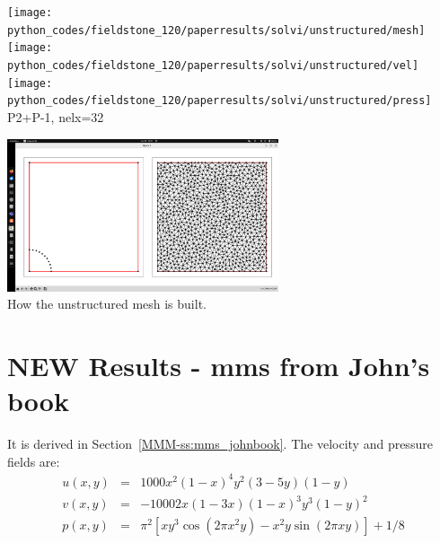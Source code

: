 \begin{center}
\texttt{[image: python\_codes/fieldstone\_120/paperresults/solvi/unstructured/mesh]}
\texttt{[image: python\_codes/fieldstone\_120/paperresults/solvi/unstructured/vel]}
\texttt{[image: python\_codes/fieldstone\_120/paperresults/solvi/unstructured/press]}\\
{\captionfont P2+P-1, nelx=32}
\end{center}


\begin{center}
\includegraphics[width=8cm]{python_codes/fieldstone_120/images/solvi_mesh}\\
{\captionfont How the unstructured mesh is built.}
\end{center}








\newpage
\section*{NEW Results - mms from John's book}

It is derived in Section~\ref{MMM-ss:mms_johnbook}. The velocity and pressure fields are:
\begin{eqnarray}
u(x,y) &=& 1000 x^2(1-x)^4  y^2 (3-5y) (1-y) \\
v(x,y) &=& -1000 2x(1-3x) (1-x)^3  y^3(1-y)^2   \\
p(x,y) &=& \pi^2 [xy^3 \cos(2\pi x^2 y) - x^2y \sin(2\pi xy) ]+1/8
\end{eqnarray}

